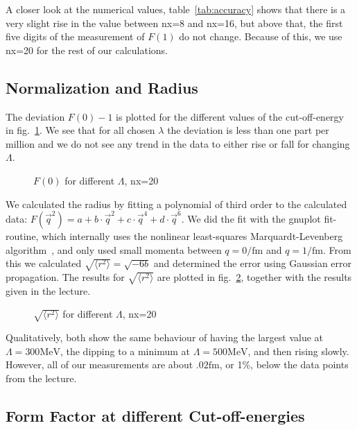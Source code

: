 \documentclass{scrartcl}
\begin{document}
A closer look at the numerical values, table~\ref{tab:accuracy} shows that there is a very slight rise in the value between nx=8 and nx=16, but above that, the first five digits of the measurement of $F(1)$ do not change. Because of this, we use nx=20 for the rest of our calculations.

\subsection{Normalization and Radius}
The deviation $F(0)-1$ is plotted for the different values of the cut-off-energy in fig.~\ref{fig:fofzero}. We see that for all chosen $\lambda$ the deviation is less than one part per million and we do not see any trend in the data to either rise or fall for changing $\Lambda$.
  
  
\begin{figure}[htbp]
	
	\caption{$F(0)$ for different $\Lambda$, nx=20}
	\label{fig:fofzero}
\end{figure}

We calculated the radius by fitting a polynomial of third order to the calculated data: $F(\vec{q}^2)=a+b\cdot \vec{q}^2+c\cdot\vec{q}^4+d\cdot\vec{q}^6$. We did the fit with the gnuplot fit-routine, which internally uses the nonlinear least-squares Marquardt-Levenberg algorithm~\cite[p. 74]{gnuplotdoc}, and only used small momenta between $q=0\si{\per\femto\meter}$ and $q=1\si{\per\femto\meter}$. From this we calculated $\sqrt{\langle r^2\rangle}=\sqrt{-6b}$ and determined the error using Gaussian error propagation. The results for $\sqrt{\langle r^2\rangle}$ are plotted in fig.~\ref{fig:radius}, together with the results given in the lecture.

\begin{figure}[htbp]
	
	\caption{$\sqrt{\langle r^2\rangle}$ for different $\Lambda$, nx=20}
	\label{fig:radius}
\end{figure}

Qualitatively, both show the same behaviour of having the largest value at $\Lambda=300\si{\mega\electronvolt}$, the dipping to a minimum at $\Lambda=500\si{\mega\electronvolt}$, and then rising slowly. However, all of our measurements are about $.02\si{\femto\meter}$, or 1\%, below the data points from the lecture.

\subsection{Form Factor at different Cut-off-energies}
\end{document}
